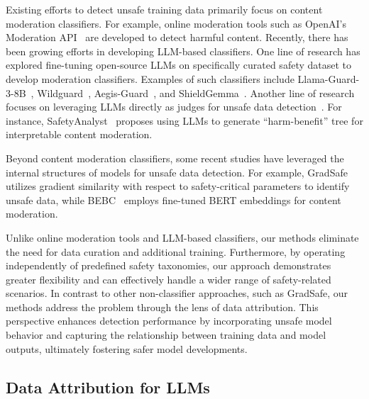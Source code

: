 Existing efforts to detect unsafe training data primarily focus on content moderation classifiers. For example, online moderation tools such as OpenAI’s Moderation API~\citep{markov2023holisticapproachundesiredcontent} are developed to detect harmful content. Recently, there has been growing efforts in developing LLM-based classifiers. One line of research has explored fine-tuning open-source LLMs on specifically curated safety dataset to develop moderation classifiers. Examples of such classifiers include Llama-Guard-3-8B~\citep{dubey2024llama3herdmodels}, Wildguard~\citep{han2024wildguardopenonestopmoderation}, Aegis-Guard~\citep{ghosh2024aegis}, and ShieldGemma~\citep{zeng2024shieldgemmagenerativeaicontent}. Another line of research focuses on leveraging LLMs directly as judges for unsafe data detection~\citep{10.1145/3599696.3612895,li2024safetyanalystinterpretabletransparentsteerable}. For instance, SafetyAnalyst~\citep{li2024safetyanalystinterpretabletransparentsteerable} proposes using LLMs to generate ``harm-benefit'' tree for interpretable content moderation. 

Beyond content moderation classifiers, some recent studies have leveraged the internal structures of models for unsafe data detection. For example, GradSafe~\citep{xie2024gradsafedetectingjailbreakprompts} utilizes gradient similarity with respect to safety-critical parameters to identify unsafe data, while BEBC~\citep{zheng2024lightweightsafetyguardrailsusing} employs fine-tuned BERT embeddings for content moderation.

Unlike online moderation tools and LLM-based classifiers, our methods eliminate the need for data curation and additional training. Furthermore, by operating independently of predefined safety taxonomies, our approach demonstrates greater flexibility and can effectively handle a wider range of safety-related scenarios. In contrast to other non-classifier approaches, such as GradSafe, our methods address the problem through the lens of data attribution. This perspective enhances detection performance by incorporating unsafe model behavior and capturing the relationship between training
data and model outputs, ultimately fostering safer model developments.

\subsection{Data Attribution for LLMs}

